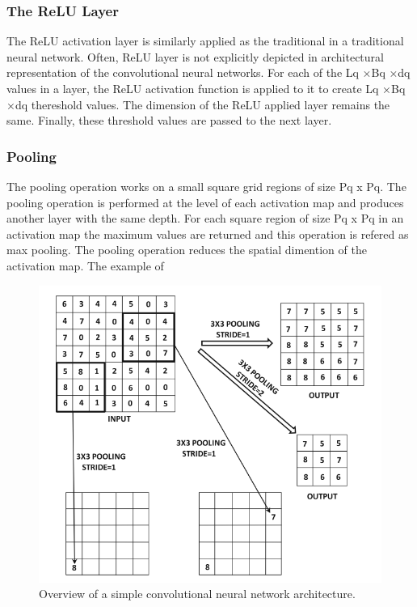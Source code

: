 \subsubsection{The ReLU Layer}
The ReLU activation layer is similarly applied as the traditional in a traditional neural network. Often, ReLU layer is not explicitly depicted in architectural representation of the convolutional neural networks. For each of the Lq ×Bq ×dq values in a layer, the ReLU activation function is applied to it to create Lq ×Bq ×dq thereshold values. The dimension of the ReLU applied layer remains the same. Finally, these threshold values are passed to the next layer. %
\subsubsection{Pooling}
The pooling operation works on a small square grid regions of size Pq x Pq. The pooling operation is performed at the level of each activation map and produces another layer with the same depth. For each square region of size Pq x Pq in an activation map the maximum values are returned and this operation is refered as max pooling. The pooling operation reduces the spatial dimention of the activation map. The example of
\begin{figure}[h]
\centering
 \includegraphics[width=\linewidth]{Figures/fig_cnn_pooling.png}
 \caption{Overview of a simple convolutional neural network architecture.}
 \label{fig:cnn_convolution}
\end{figure}



